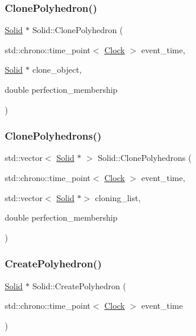 \subsubsection{\texorpdfstring{Clone\+Polyhedron()}{ClonePolyhedron()}}
{\footnotesize\ttfamily \mbox{\hyperlink{classSolid}{Solid}} $\ast$ Solid\+::\+Clone\+Polyhedron (\begin{DoxyParamCaption}\item[{std\+::chrono\+::time\+\_\+point$<$ \mbox{\hyperlink{universe_8h_a0ef8d951d1ca5ab3cfaf7ab4c7a6fd80}{Clock}} $>$}]{event\+\_\+time,  }\item[{\mbox{\hyperlink{classSolid}{Solid}} $\ast$}]{clone\+\_\+object,  }\item[{double}]{perfection\+\_\+membership }\end{DoxyParamCaption})}

\mbox{\label{classSolid_a1e650b6d8437acfaf7b9384b885d77bf}} 
\subsubsection{\texorpdfstring{Clone\+Polyhedrons()}{ClonePolyhedrons()}}
{\footnotesize\ttfamily std\+::vector$<$ \mbox{\hyperlink{classSolid}{Solid}} $\ast$ $>$ Solid\+::\+Clone\+Polyhedrons (\begin{DoxyParamCaption}\item[{std\+::chrono\+::time\+\_\+point$<$ \mbox{\hyperlink{universe_8h_a0ef8d951d1ca5ab3cfaf7ab4c7a6fd80}{Clock}} $>$}]{event\+\_\+time,  }\item[{std\+::vector$<$ \mbox{\hyperlink{classSolid}{Solid}} $\ast$$>$}]{cloning\+\_\+list,  }\item[{double}]{perfection\+\_\+membership }\end{DoxyParamCaption})}

\mbox{\label{classSolid_a231b2c469aab60b092fcc3a9525e5c80}} 
\subsubsection{\texorpdfstring{Create\+Polyhedron()}{CreatePolyhedron()}}
{\footnotesize\ttfamily \mbox{\hyperlink{classSolid}{Solid}} $\ast$ Solid\+::\+Create\+Polyhedron (\begin{DoxyParamCaption}\item[{std\+::chrono\+::time\+\_\+point$<$ \mbox{\hyperlink{universe_8h_a0ef8d951d1ca5ab3cfaf7ab4c7a6fd80}{Clock}} $>$}]{event\+\_\+time }\end{DoxyParamCaption})}

